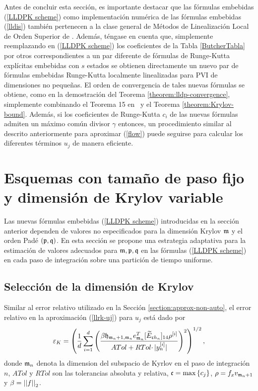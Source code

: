 Antes de concluir esta sección, es importante destacar que las fórmulas embebidas (\ref{LLDPK scheme}) como implementación numérica de las fórmulas embebidas (\ref{lldis}) también pertenecen a la clase general de Métodos de Linealización Local de Orden Superior de \cite{Jimenez13}. Además, téngase en cuenta que, simplemente reemplazando en (\ref{LLDPK scheme}) los coeficientes de la Tabla \ref{ButcherTabla} por otros correspondientes a un par diferente de fórmulas de Runge-Kutta explícitas embebidas con $s$ estados se obtienen directamente un nuevo par de fórmulas embebidas Runge-Kutta localmente linealizadas para PVI de dimensiones no pequeñas. El orden de convergencia de tales nuevas fórmulas se obtiene, como en la demostración del Teorema \ref{theorem:lldp-convergence}, simplemente combinando el Teorema 15 en~\cite{Jimenez13} y el Teorema \ref{theorem:Krylov-bound}. Además, si los coeficientes de Runge-Kutta $c_i$ de las nuevas fórmulas admiten un máximo común divisor $\gamma$ entonces, un procedimiento similar al descrito anteriormente para aproximar (\ref{flow}) puede seguirse para calcular los diferentes términos $u_j$ de manera eficiente.

\section{Esquemas con tamaño de paso fijo y dimensión de Krylov variable}\label{section:lldp-fix-step}

Las nuevas fórmulas embebidas (\ref{LLDPK scheme}) introducidas en la sección anterior dependen de valores no especificados para la dimensión Krylov $\mathfrak{m}$ y el orden Padé $(\mathfrak{p} ,\mathfrak{q})$. En esta sección se propone una estrategia adaptativa para la estimación de valores adecuados para $\mathfrak{m}, \mathfrak{p} ,\mathfrak{q}$ en las fórmulas (\ref{LLDPK scheme}) en cada paso de integración sobre una partición de tiempo uniforme.

\subsection{Selección de la dimensión de Krylov}\label{sec:selkrydim}

Similar al error relativo utilizado en la Sección \ref{section:approx-non-auto}, el error relativo en la aproximación (\ref{llrk-uj}) para $u_j$ está dado por
\begin{equation}
    \varepsilon_{K} = \left(\frac{1}{d}\sum\limits_{i=1}^{d} \left(\frac{\beta
        \mathfrak{h}_{\mathfrak{m}_n+1,\mathfrak{m}_n} e_{\mathfrak{m}_n}^T
        [\widetilde{E}_{\mathfrak{c}h_n}]_{14} \rho^{[i]}}{ATol+ RTol\cdotp
        \rvert y_{n}^{[i]}\rvert}\right)^{2}\right)^{1/2},
    \label{errrel}
\end{equation}
donde $\mathfrak{m}_n$ denota la dimension del subspacio de Kyrlov en el paso de integración $n$, $ATol$ y $RTol$ son las tolerancias absoluta y relativa, $\mathfrak{c}=\max\left\{ c_j \right\}$, $\rho = f_x v_{\mathfrak{m}_n+1}$ y $\beta=\left\lvert \left\lvert f \right\rvert \right\rvert_2$.

